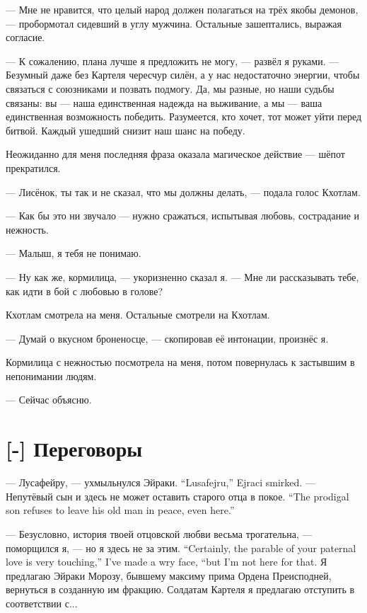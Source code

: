 --- Мне не нравится, что целый народ должен полагаться на трёх якобы демонов, --- пробормотал сидевший в углу мужчина.
Остальные зашептались, выражая согласие.

--- К сожалению, плана лучше я предложить не могу, --- развёл я руками.
--- Безумный даже без Картеля чересчур силён, а у нас недостаточно энергии, чтобы связаться с союзниками и позвать подмогу.
Да, мы разные, но наши судьбы связаны: вы --- наша единственная надежда на выживание, а мы --- ваша единственная возможность победить.
Разумеется, кто хочет, тот может уйти перед битвой.
Каждый ушедший снизит наш шанс на победу.

Неожиданно для меня последняя фраза оказала магическое действие --- шёпот прекратился.

--- Лисёнок, ты так и не сказал, что мы должны делать, --- подала голос Кхотлам.

--- Как бы это ни звучало --- нужно сражаться, испытывая любовь, сострадание и нежность.

--- Малыш, я тебя не понимаю.

--- Ну как же, кормилица, --- укоризненно сказал я.
--- Мне ли рассказывать тебе, как идти в бой с любовью в голове?

Кхотлам смотрела на меня.
Остальные смотрели на Кхотлам.

--- Думай о вкусном броненосце, --- скопировав её интонации, произнёс я.

Кормилица с нежностью посмотрела на меня, потом повернулась к застывшим в непонимании людям.

--- Сейчас объясню.

\section{[-] Переговоры}

\textspace

{--- Лусафейру, --- ухмыльнулся Эйраки.}
{``Lusafejru,'' Ejraci smirked.}
{--- Непутёвый сын и здесь не может оставить старого отца в покое.}
{``The prodigal son refuses to leave his old man in peace, even here.''}

{--- Безусловно, история твоей отцовской любви весьма трогательна, --- поморщился я, --- но я здесь не за этим.}
{``Certainly, the parable of your paternal love is very touching,'' I've made a wry face, ``but I'm not here for that.}
Я предлагаю Эйраки Морозу, бывшему максиму прима Ордена Преисподней, вернуться в созданную им фракцию.
Солдатам Картеля я предлагаю отступить в соответствии с...

